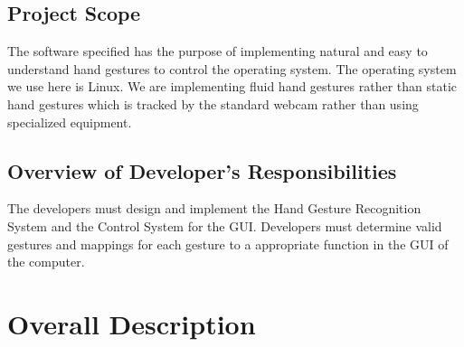 \documentclass[11pt]{report}
\begin{document}
\subsection{Project Scope}
The software specified has the purpose of implementing natural and easy to understand hand gestures to control the operating system. The operating system we use here is Linux. We are implementing fluid hand gestures rather than static hand gestures which is tracked by the standard webcam rather than using specialized equipment.

\subsection{Overview of Developer's Responsibilities}
The developers must design and implement the Hand Gesture Recognition System and the Control System for the GUI. Developers must determine valid gestures and mappings for each gesture to a appropriate function in the GUI of the computer. 




\newpage
\section{Overall Description}
\end{document}

